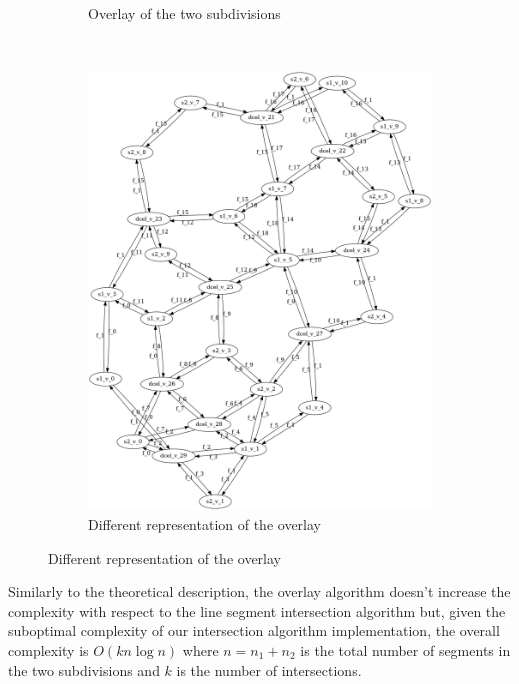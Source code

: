 \begin{figure}[H]
\begin{subfigure}{0.5\textwidth}
        \caption{Overlay of the two subdivisions}
        \label{fig:overlay_result}
    \end{subfigure}\\
    \break
    \begin{subfigure}{\textwidth}
        \centering
        \includegraphics[width=0.5\linewidth]{images/test_1_test_2_graph.png}
        \caption{Different representation of the overlay}
        \label{fig:overlay_faces}
    \end{subfigure}
\end{figure}

Similarly to the theoretical description, the overlay algorithm doesn't increase the complexity with respect to the line segment intersection algorithm but, given the suboptimal complexity of our intersection algorithm implementation, the overall complexity is $O(kn\log n)$ where $n = n_1 + n_2$ is the total number of segments in the two subdivisions and $k$ is the number of intersections.

